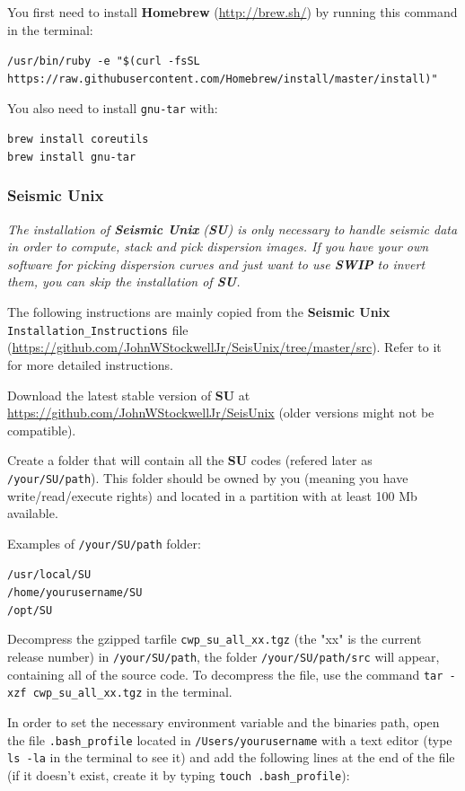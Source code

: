 \documentclass[twoside,a4paper]{article}
\def\SWIP{\textbf{SWIP}}
\def\SU{\textbf{SU}}
\def\SeismicUnix{\textbf{Seismic Unix}}
\begin{document}
You first need to install \textbf{Homebrew} (\url{http://brew.sh/}) by running this command in the terminal:

\verb|/usr/bin/ruby -e "$(curl -fsSL https://raw.githubusercontent.com/Homebrew/install/master/install)"|

You also need to install \verb|gnu-tar| with:

\verb|brew install coreutils|\\
\verb|brew install gnu-tar|

\subsubsection{Seismic Unix}
\textit{The installation of {\SeismicUnix} ({\SU}) is only necessary to handle seismic data in order to compute, stack and pick dispersion images. If you have your own software for picking dispersion curves and just want to use {\SWIP} to invert them, you can skip the installation of {\SU}.}

The following instructions are mainly copied from the {\SeismicUnix} \verb|Installation_Instructions| file (\url{https://github.com/JohnWStockwellJr/SeisUnix/tree/master/src}). Refer to it for more detailed instructions.

Download the latest stable version of {\SU} at \url{https://github.com/JohnWStockwellJr/SeisUnix} (older versions might not be compatible).

Create a folder that will contain all the {\SU} codes (refered later as \verb|/your/SU/path|). This folder should be owned by you (meaning you have write/read/execute rights) and located in a partition with at least 100 Mb available.

Examples of \verb|/your/SU/path| folder:

\verb|/usr/local/SU|\\
\verb|/home/yourusername/SU|\\
\verb|/opt/SU|

Decompress the gzipped tarfile \verb|cwp_su_all_xx.tgz| (the "xx" is the current release number) in \verb|/your/SU/path|, the folder \verb|/your/SU/path/src| will appear, containing all of the source code. To decompress the file, use the command \verb|tar -xzf cwp_su_all_xx.tgz| in the terminal.

In order to set the necessary environment variable and the binaries path, open the file \verb|.bash_profile| located in \verb|/Users/yourusername| with a text editor (type \verb|ls -la| in the terminal to see it) and add the following lines at the end of the file (if it doesn't exist, create it by typing \verb|touch .bash_profile|):
\end{document}
